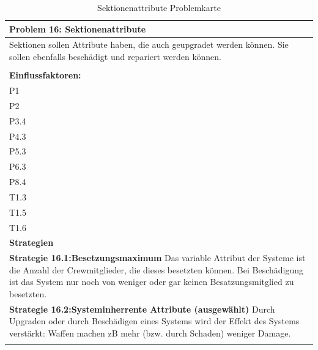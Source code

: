 \documentclass[fontsize=12pt,paper=a4,twoside]{scrartcl}
\begin{document}
\begin{table}[H]
    \centering
    \begin{tabular}{|p{15cm}|}
    \hline
          \textbf{Problem 16: Sektionenattribute}  \\ \hline
	Sektionen sollen Attribute haben, die auch geupgradet werden können. Sie sollen ebenfalls beschädigt und repariert werden können. \\
         \\ \hline
          \textbf{Einflussfaktoren: } \\
	P1 \\
	P2 \\
	P3.4 \\
	P4.3 \\
	P5.3 \\
	P6.3 \\
	P8.4 \\
	T1.3 \\
	T1.5 \\
	T1.6 \\
          \hline
          \textbf{Strategien} \\ \hline
            {}          
           \label{strategie:16.1}     
          \textbf{Strategie 16.1:Besetzungsmaximum} Das variable Attribut der Systeme ist die Anzahl der Crewmitglieder, die dieses besetzten können. Bei Beschädigung ist das System nur noch von weniger oder gar keinen Besatzungsmitglied zu besetzten.  \\        
  {}          
           \label{strategie:16.2}              
          \textbf{Strategie 16.2:Systeminherrente Attribute (ausgewählt)} Durch Upgraden oder durch Beschädigen eines Systems wird der Effekt des Systems verstärkt: Waffen machen zB mehr (bzw. durch Schaden) weniger Damage.  \\
	 \\ \hline
    \end{tabular}

    \caption{Sektionenattribute Problemkarte}
    \label{tab:ProblemKarte16}
\end{table}
\end{document}
